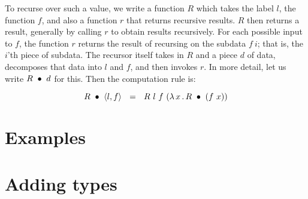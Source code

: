 \documentclass{article}
\begin{document}
To recurse over such a value, we write a function $R$ which takes the
label $l$, the function $f$, and also a function $r$ that returns
recursive results.  $R$ then returns a result, generally by calling
$r$ to obtain results recursively.  For each possible input to $f$,
the function $r$ returns the result of recursing on the subdata
$f\ i$; that is, the $i$'th piece of subdata.  The recursor itself
takes in $R$ and a piece $d$ of data, decomposes that data into $l$ and $f$,
and then invokes $r$.  In more detail, let us write $R\ \bullet\ d$
for this.  Then the computation rule is:

\[
\wrec{R}{\ctor{l}{f}} \ \ = \ \ R\ l\ f\ (\lam{x}{\wrec{R}{(f\ x)}})
\]

\section{Examples}

\section{Adding types}



\end{document}
